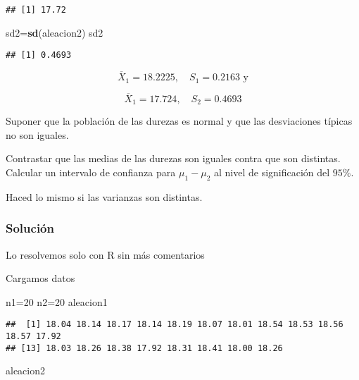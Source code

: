 \documentclass[
]{article}
\newenvironment{Shaded}{\begin{snugshade}}{\end{snugshade}}
\newcommand{\DecValTok}[1]{\textcolor[rgb]{0.00,0.00,0.81}{#1}}
\newcommand{\KeywordTok}[1]{\textcolor[rgb]{0.13,0.29,0.53}{\textbf{#1}}}
\newcommand{\NormalTok}[1]{#1}
\begin{document}
\begin{verbatim}
## [1] 17.72
\end{verbatim}

\begin{Shaded}
\begin{Highlighting}[]
\NormalTok{sd2=}\KeywordTok{sd}\NormalTok{(aleacion2)}
\NormalTok{sd2}
\end{Highlighting}
\end{Shaded}

\begin{verbatim}
## [1] 0.4693
\end{verbatim}

\[\overline{X}_{1}=18.2225,\quad S_{1}=0.2163 \mbox{ y}\]

\[\overline{X}_{1}=17.724,\quad S_{2}=0.4693\]

Suponer que la población de las durezas es normal y que las desviaciones
típicas no son iguales.

Contrastar que las medias de las durezas son iguales contra que son
distintas. Calcular un intervalo de confianza para \(\mu_{1}-\mu_{2}\)
al nivel de significación del \(95\%\).

Haced lo mismo si las varianzas son distintas.

\hypertarget{soluciuxf3n-3}{%
\subsubsection{Solución}\label{soluciuxf3n-3}}

Lo resolvemos solo con R sin más comentarios

Cargamos datos

\begin{Shaded}
\begin{Highlighting}[]
\NormalTok{n1=}\DecValTok{20}
\NormalTok{n2=}\DecValTok{20}
\NormalTok{aleacion1}
\end{Highlighting}
\end{Shaded}

\begin{verbatim}
##  [1] 18.04 18.14 18.17 18.14 18.19 18.07 18.01 18.54 18.53 18.56 18.57 17.92
## [13] 18.03 18.26 18.38 17.92 18.31 18.41 18.00 18.26
\end{verbatim}

\begin{Shaded}
\begin{Highlighting}[]
\NormalTok{aleacion2}
\end{Highlighting}
\end{Shaded}
\end{document}

